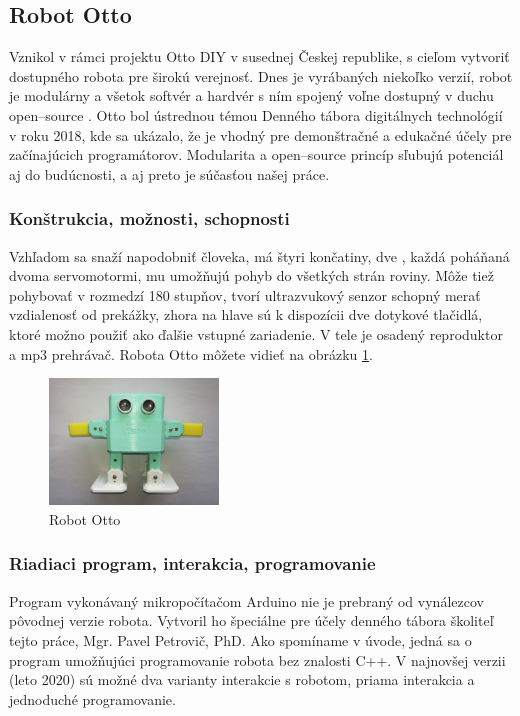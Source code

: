 \subsection{Robot Otto}
\label{sub:otto}
Vznikol v rámci projektu Otto DIY v susednej Českej republike, s cieľom vytvoriť dostupného robota pre širokú verejnosť. Dnes je vyrábaných niekoľko verzií, robot je modulárny a všetok softvér a hardvér s ním spojený voľne dostupný v duchu open--source \cite{OttoDIY}. Otto bol ústrednou témou Denného tábora digitálnych technológií v roku 2018, kde sa ukázalo, že je vhodný pre demonštračné a edukačné účely pre začínajúcich programátorov. Modularita a open--source princíp sľubujú potenciál aj do budúcnosti, a aj preto je súčasťou našej práce.

\subsubsection{Konštrukcia, možnosti, schopnosti}
Vzhľadom sa snaží napodobniť človeka, má štyri končatiny, dve , každá poháňaná dvoma servomotormi, mu umožňujú pohyb do všetkých strán roviny. Môže tiež pohybovať  v rozmedzí 180 stupňov,  tvorí ultrazvukový senzor schopný merať vzdialenosť od prekážky, zhora na hlave sú k dispozícii dve dotykové tlačidlá, ktoré možno použiť ako ďalšie vstupné zariadenie. V tele je osadený reproduktor a mp3 prehrávač. Robota Otto môžete vidieť na obrázku \ref{obr:otto}.

\begin{figure}
\centerline{\includegraphics[width=0.4\textwidth]{images/otto}}
\caption[Robot Otto]{Robot Otto}
\label{obr:otto}
\end{figure}

\subsubsection{Riadiaci program, interakcia, programovanie}
\label{subsub:otto-programovanie}
Program vykonávaný mikropočítačom Arduino nie je prebraný od vynálezcov pôvodnej verzie robota. Vytvoril ho špeciálne pre účely denného tábora školiteľ tejto práce, Mgr. Pavel Petrovič, PhD. Ako spomíname v úvode, jedná sa o program umožňujúci programovanie robota bez znalosti C++. V najnovšej verzii (leto 2020) sú možné dva varianty interakcie s robotom, priama interakcia a jednoduché programovanie.

